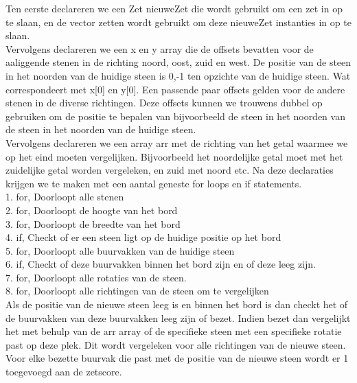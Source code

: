 \documentclass{article}
\begin{document}
Ten eerste declareren we een Zet nieuweZet die wordt gebruikt om een zet in op te slaan, en de vector zetten wordt gebruikt om deze nieuweZet instanties in op te slaan.\\

Vervolgens declareren we een x en y array die de offsets bevatten voor de aaliggende stenen in de richting noord, oost, zuid en west. 
De positie van de steen in het noorden van de huidige steen is 0,-1 ten opzichte van de huidige steen. Wat correspondeert met x[0] en y[0]. Een passende paar offsets gelden voor de andere stenen in de diverse richtingen. Deze offsets kunnen we trouwens dubbel op gebruiken om de positie te bepalen van bijvoorbeeld de steen in het noorden van de steen in het noorden van de huidige steen.\\

Vervolgens declareren we een array arr met de richting van het getal waarmee we op het eind moeten vergelijken. Bijvoorbeeld het noordelijke getal moet met het zuidelijke getal worden vergeleken, en zuid met noord etc.
Na deze declaraties krijgen we te maken met een aantal geneste for loops en if statements.\\
1. for, Doorloopt alle stenen \\
2. for, Doorloopt de hoogte van het bord\\
3. for, Doorloopt de breedte van het bord\\
4. if, Checkt of er een steen ligt op de huidige positie op het bord\\
5. for, Doorloopt alle buurvakken van de huidige steen\\
6. if, Checkt of deze buurvakken binnen het bord zijn en of deze leeg zijn.\\
7. for, Doorloopt alle rotaties van de steen.\\
8. for, Doorloopt alle richtingen van de steen om te vergelijken \\

Als de positie van de nieuwe steen leeg is en binnen het bord is dan checkt het of de buurvakken van deze buurvakken leeg zijn of bezet. Indien bezet dan vergelijkt het met behulp van de arr array of de specifieke steen met een specifieke rotatie past op deze plek. Dit wordt vergeleken voor alle richtingen van de nieuwe steen. \\

Voor elke bezette buurvak die past met de positie van de nieuwe steen wordt er 1 toegevoegd aan de zetscore.\\
\end{document}
